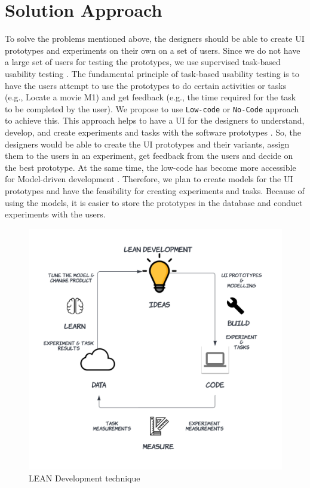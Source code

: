\section{Solution Approach}
\label{intro:section:solution}
To solve the problems mentioned above, the designers should be able to create UI prototypes and experiments on their own on a set of users.
Since we do not have a large set of users for testing the prototypes, we use supervised task-based usability testing \cite{article:dataanalysis:supervisedtest}.
The fundamental principle of task-based usability testing is to have the users attempt to use the prototypes to do certain activities or tasks (e.g., Locate a movie M1) and get feedback (e.g., the time required for the task to be completed by the user).
We propose to use \texttt{Low-code} or \texttt{No-Code} approach to achieve this.
This approach helps to have a UI for the designers to understand, develop, and create experiments and tasks with the software prototypes \cite{paper:lowcode:khorram}.
So, the designers would be able to create the UI prototypes and their variants, assign them to the users in an experiment, get feedback from the users and decide on the best prototype.
At the same time, the low-code has become more accessible for Model-driven development \cite{article:lowcode:modeldriven}.
Therefore, we plan to create models for the UI prototypes and have the feasibility for creating experiments and tasks. 
Because of using the models, it is easier to store the prototypes in the database and conduct experiments with the users. 

\begin{figure}[ht]
    \centering
    \includegraphics[scale=0.15]{images/solution-ideas/LEAN.png}
    \caption{LEAN Development technique}
    \label{intro:fig:lean}
\end{figure}

